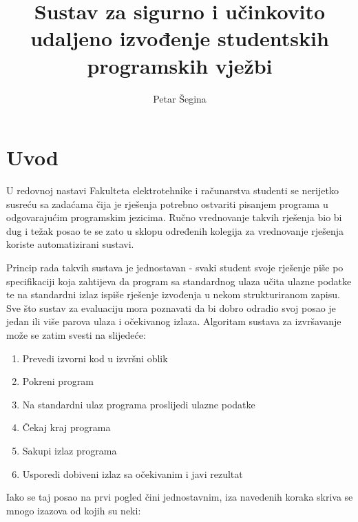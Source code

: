 \documentclass[times, utf8, zavrsni]{fer}
\begin{document}

\title{Sustav za sigurno i učinkovito udaljeno izvođenje studentskih programskih vježbi}

\author{Petar Šegina}

\maketitle

\izvornik

\zahvala{}

\tableofcontents

\chapter{Uvod}

U redovnoj nastavi Fakulteta elektrotehnike i računarstva studenti se nerijetko susreću sa zadaćama čija je rješenja potrebno ostvariti pisanjem programa u odgovarajućim programskim jezicima. Ručno vrednovanje takvih rješenja bio bi dug i težak posao te se zato u sklopu određenih kolegija za vrednovanje rješenja koriste automatizirani sustavi.

Princip rada takvih sustava je jednostavan - svaki student svoje rješenje piše po specifikaciji koja zahtijeva da program sa standardnog ulaza učita ulazne podatke te na standardni izlaz ispiše rješenje izvođenja u nekom strukturiranom zapisu. Sve što sustav za evaluaciju mora poznavati da bi dobro odradio svoj posao je jedan ili više parova ulaza i očekivanog izlaza. Algoritam sustava za izvršavanje može se zatim svesti na slijedeće:

\begin{enumerate}
\item Prevedi izvorni kod u izvršni oblik
\item Pokreni program
\item Na standardni ulaz programa proslijedi ulazne podatke
\item Čekaj kraj programa
\item Sakupi izlaz programa
\item Usporedi dobiveni izlaz sa očekivanim i javi rezultat
\end{enumerate}

Iako se taj posao na prvi pogled čini jednostavnim, iza navedenih koraka skriva se mnogo izazova od kojih su neki:
\end{document}
